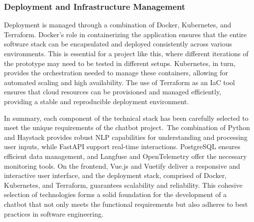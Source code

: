 \subsubsection{Deployment and Infrastructure Management}

Deployment is managed through a combination of Docker, Kubernetes, and Terraform.
Docker’s role in containerizing the application ensures that the entire software stack can be encapsulated and deployed
consistently across various environments.\autocite[cf.][p. 191]{openjaStudyingPracticesDeploying2022} This is essential
for a project like this, where different iterations of the prototype may need to be tested in different setups.
Kubernetes, in turn, provides the orchestration needed to manage these containers, allowing for automated scaling and
high availability.\autocite[cf.][pp. 2,7-8]{carrionKubernetesSchedulingTaxonomy2022} The use of Terraform as an \ac{IaC}
tool ensures that cloud resources can be provisioned and managed efficiently, providing a stable and reproducible
deployment environment.\autocite[cf.][p. 24]{n.EvaluatingDevopsTools2023}

\vspace{0,75cm}

In summary, each component of the technical stack has been carefully selected to meet the unique requirements of the
chatbot project.\ The combination of Python and Haystack provides robust \acs{NLP} capabilities for understanding and
processing user inputs, while FastAPI support real-time interactions. PostgreSQL ensures efficient data management,
and Langfuse and OpenTelemetry offer the necessary monitoring tools. On the frontend, Vue.js and Vuetify deliver a
responsive and interactive user interface, and the deployment stack, comprised of Docker, Kubernetes, and Terraform,
guarantees scalability and reliability. This cohesive selection of technologies forms a solid foundation for the
development of a chatbot that not only meets the functional requirements but also adheres to best practices in software
engineering.
